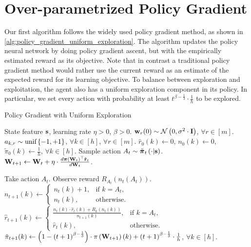 \section{Over-parametrized Policy Gradient}
\label{sec:policy_gradient}

Our first algorithm follows the widely used policy gradient method, as shown in \cref{alg:policy_gradient_uniform_exploration}.
The algorithm updates the policy neural network by doing policy gradient ascent, but with the empirically estimated reward as its objective. 
Note that in contrast a traditional policy gradient method would rather use the current reward as an estimate of the expected reward for its learning objective.
To balance between exploration and exploitation, the agent also has a uniform exploration component in its policy. 
In particular, we set every action with probability at least $t^{ \beta - \frac{1}{3}} \cdot \frac{1}{h}$ to be explored. 


\begin{algorithm}[t]
   \caption{Policy Gradient with Uniform Exploration}
\label{alg:policy_gradient_uniform_exploration}
\begin{algorithmic}
    State feature ${\mathbf{s}}$, learning rate $\eta > 0$, $\beta > 0$.
   \STATE ${\mathbf{w}}_r(0) \sim {\mathcal{N}}\left( 0, \sigma^2 \cdot {\mathbf{I}} \right)$, $\forall r \in [m]$. $a_{k, r} \sim 
   {\text{unif}}\left\{-1, +1\right\}$, $\forall k \in [h]$, $\forall r \in [m]$.
   \STATE $\hat{r}_{0}(k) \gets 0$, $n_{0}(k) \gets 0$, $\tilde{\pi}_0(k) \gets \frac{1}{h}$, $\forall k \in [h]$.
   \STATE Sample action $A_{t} \sim \tilde{{\boldsymbol{\pi}}}_{t}\left(\cdot \middle| {\mathbf{s}} \right)$.
   \STATE ${\mathbf{W}}_{t+1} \leftarrow {\mathbf{W}}_t + \eta \cdot \frac{d {\boldsymbol{\pi}}\left({\mathbf{W}}_t\right)^\top \hat{{\mathbf{r}}}_t}{d {\mathbf{W}}_t}$.
   
   \STATE Take action $A_{t}$. Observe reward $R_{ A_{t}}\left(n_{t}\left(A_t\right) \right)$.
   \STATE $n_{t+1}(k) \gets \left. 
		\begin{cases}
		n_{t}(k) + 1, & \text{if } k = A_t, \\
		n_{t}(k), & \text{otherwise}.
		\end{cases}
		\right. \qquad$ 
   $\hat{r}_{t+1}(k) \gets \left. 
		\begin{cases}
		\frac{n_{t}(k) \cdot \hat{r}_{t}(k) + R_{k}\left(n_{t}(k)\right) }{n_{t+1}(k)}, & \text{if } k = A_t, \\
		\hat{r}_{t}(k), & \text{otherwise}.
		\end{cases}
		\right.$
   \STATE $\tilde{\pi}_{t+1}(k) \gets \left( 1 - \left(t+1\right)^{ \beta - \frac{1}{3}} \right) \cdot \pi\left({\mathbf{W}}_{t+1}\right)(k) + \left(t+1\right)^{ \beta - \frac{1}{3}} \cdot \frac{1}{h}$, $\forall k \in [h]$.
   \ENDFOR
\end{algorithmic}
\end{algorithm}


